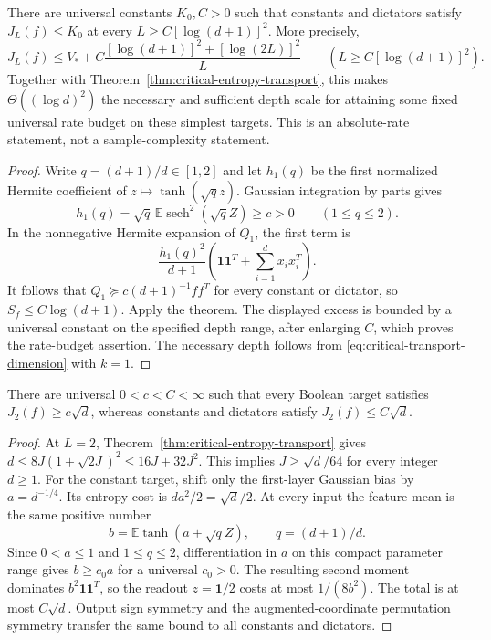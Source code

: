 \begin{corollary}
\label{cor:critical-constant-depth}
There are universal constants $K_0,C>0$ such that constants and
dictators satisfy $J_L(f)\le K_0$ at every
$L\ge C[\log(d+1)]^2$. More precisely,
\[
 J_L(f)\le V_*+
 C\frac{[\log(d+1)]^2+[\log(2L)]^2}{L}
 \qquad(L\ge C[\log(d+1)]^2).
\]
Together with Theorem~\ref{thm:critical-entropy-transport}, this makes
$\Theta((\log d)^2)$ the necessary and sufficient depth scale for
attaining some fixed universal rate budget on these simplest targets.
This is an absolute-rate statement, not a sample-complexity statement.
\end{corollary}

\begin{proof}
Write $q=(d+1)/d\in[1,2]$ and let $h_1(q)$ be the first normalized
Hermite coefficient of $z\mapsto\tanh(\sqrt qz)$. Gaussian integration
by parts gives
\[
 h_1(q)=\sqrt q\,\mathbb E\operatorname{sech}^2(\sqrt qZ)\ge c>0
 \qquad(1\le q\le2).
\]
In the nonnegative Hermite expansion of $Q_1$, the first term is
\[
 \frac{h_1(q)^2}{d+1}
 \left(\boldsymbol1\boldsymbol1^T+
       \sum_{i=1}^d x_i x_i^T\right).
\]
It follows that $Q_1\succeq c(d+1)^{-1}ff^T$ for every constant or
dictator, so $S_f\le C\log(d+1)$. Apply the theorem. The displayed
excess is bounded by a universal constant on the specified depth
range, after enlarging $C$, which proves the rate-budget assertion.
The necessary depth follows from
\eqref{eq:critical-transport-dimension} with $k=1$.
\end{proof}


\begin{corollary}
\label{cor:critical-shallow-cost-scale}
There are universal $0<c<C<\infty$ such that every Boolean target
satisfies $J_2(f)\ge c\sqrt d$, whereas constants and dictators satisfy
$J_2(f)\le C\sqrt d$.
\end{corollary}

\begin{proof}
At $L=2$, Theorem~\ref{thm:critical-entropy-transport} gives
$d\le8J(1+\sqrt{2J})^2\le16J+32J^2$.
This implies $J\ge\sqrt d/64$ for every integer $d\ge1$.
For the constant target, shift only the first-layer Gaussian bias by
$a=d^{-1/4}$. Its entropy cost is $da^2/2=\sqrt d/2$.
At every input the feature mean is the same positive number
\[
 b=\mathbb E\tanh(a+\sqrt qZ),\qquad q=(d+1)/d.
\]
Since $0<a\le1$ and $1\le q\le2$, differentiation in $a$ on this
compact parameter range gives $b\ge c_0a$ for a universal $c_0>0$.
The resulting second moment dominates $b^2\boldsymbol1\boldsymbol1^T$,
so the readout $z=\boldsymbol1/2$ costs at most $1/(8b^2)$.
The total is at most $C\sqrt d$. Output sign symmetry and the
augmented-coordinate permutation symmetry transfer the same bound to
all constants and dictators.
\end{proof}

